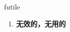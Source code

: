 
\begin{frame}
{\huge futile}
\begin{center}
\begin{enumerate}\Large
  \item \textbf{无效的，无用的}
\end{enumerate}
\end{center}
\end{frame}

